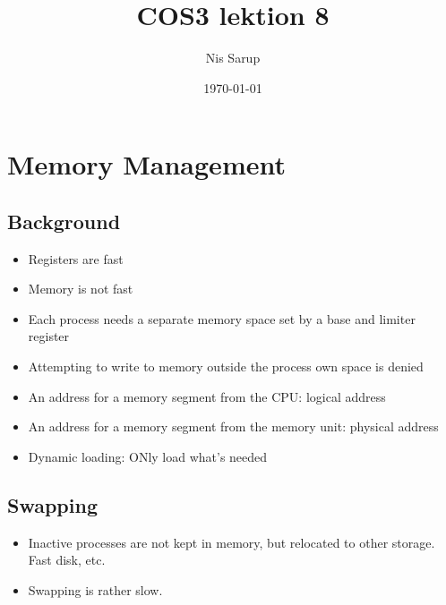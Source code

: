 \documentclass[a4wide,10pt]{article}
\begin{document}
\title{COS3 lektion 8}
\author{Nis Sarup}
\date{\today}
\maketitle


\addtocounter{section}{7}
\section{Memory Management} %
\label{sec:memory_management}
\subsection{Background} %
\label{sub:background}
\begin{itemize}
	\item Registers are fast
	\item Memory is not fast
	\item Each process needs a separate memory space set by a base and limiter register
	\item Attempting to write to memory outside the process own space is denied
	\item An address for a memory segment from the CPU: logical address
	\item An address for a memory segment from the memory unit: physical address
	\item Dynamic loading: ONly load what's needed
\end{itemize}

\subsection{Swapping} %
\label{sub:swapping}
\begin{itemize}
	\item Inactive processes are not kept in memory, but relocated to other storage. Fast disk, etc.
	\item Swapping is rather slow.
\end{itemize}
\end{document}
